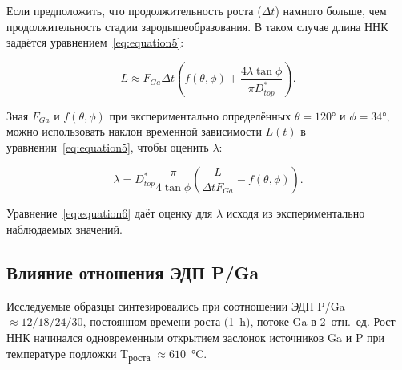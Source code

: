 Если предположить, что продолжительность роста (\(\Delta t\)) намного больше,
чем продолжительность стадии зародышеобразования. В таком случае длина ННК задаётся
уравнением~\ref{eq:equation5}:

\begin{equation} \label{eq:equation5} L\approx F_{Ga} \Delta t \left(
	f(\theta,\phi) + \frac{4 \lambda \tan{\phi}}{\pi D_{top}^\ast} \right).
\end{equation}

Зная \(F_ {Ga}\) и \(f(\theta,\phi)\) при экспериментально определённых
\(\theta = 120\si{\degree}\) и \(\phi = 34\si{\degree}\), можно использовать
наклон временной зависимости \(L(t)\) в уравнении~\ref{eq:equation5}, чтобы
оценить \(\lambda\):

\begin{equation} \label{eq:equation6} \lambda=D_{top}^\ast
	\frac{\pi}{4\tan{\phi}} \left( \frac{L}{\Delta t F_{Ga}}-f(\theta,\phi)
\right).  \end{equation}

Уравнение~\ref{eq:equation6} даёт оценку для \(\lambda\) исходя из
экспериментально наблюдаемых значений.

\subsection{Влияние отношения ЭДП P/Ga}\label{subsec:ch6/sec2/sub3}


Исследуемые образцы синтезировались при соотношении ЭДП P/Ga \(\approx
12/18/24/30\), постоянном времени роста (1~\si{\hour}), потоке Ga в 2~отн.~ед.
Рост ННК начинался одновременным открытием заслонок источников Ga и P при
температуре подложки T\textsubscript{роста} \(\approx
610\)~\si{\degreeCelsius}.

